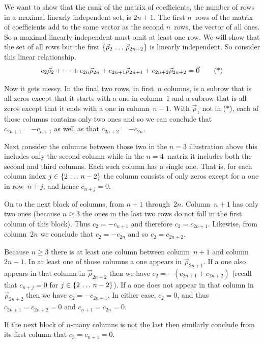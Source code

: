 We want to show that the rank of the matrix of coefficients,
the number of rows in a maximal linearly independent set, is $2n+1$.
The first $n$~rows of the matrix of coefficients add to the same vector
as the second $n$~rows, the vector of all ones.
So a maximal linearly independent must omit at least one row.
We will show that the set of all rows but the first 
$\mbox{$\{\vec{\rho}_2\,\ldots\, \vec{\rho}_{2n+2}\}$}$
is linearly independent.
So consider this linear relationship.
\begin{equation*}
  c_2\vec{\rho}_2+\cdots+c_{2n}\vec{\rho}_{2n}
     +c_{2n+1}\vec{\rho}_{2n+1}+c_{2n+2}\vec{\rho}_{2n+2}=\vec{0}
   \tag{*}
\end{equation*}

Now it gets messy.
In the final two rows, in first~$n$ columns, is a subrow that 
is all zeros except that it starts with a one in column~$1$
and a subrow that is all zeros except that it ends with a one
in column~$n-1$.
With $\vec{\rho}_1$ not in ($*$), each of those columns contains only 
two ones and so we can conclude that $c_{2n+1}=-c_{n+1}$ as well as that
$c_{2n+2}=-c_{2n}$.

Next consider the columns between those two\Dash
in the $n=3$ illustration above this includes only the second column while 
in the $n=4$~matrix it includes both the second and third columns.
Each such column has a single one.
That is, for each column index $j\in\mbox{$\{2\,\ldots\, n-2\}$}$
the column consists of only zeros except for a one in row~$n+j$, 
and hence $c_{n+j}=0$.

On to the next block of columns, from $n+1$ through~$2n$.
Column~$n+1$ has only two ones (because $n\geq 3$ the ones
in the last two rows do not fall in the first column of this
block). 
Thus $c_2=-c_{n+1}$
and therefore $c_2=c_{2n+1}$.
Likewise, from column~$2n$ we conclude that $c_2=-c_{2n}$
and so $c_2=c_{2n+2}$.  

Because $n\geq 3$
there is at least one column between column~$n+1$ and column~$2n-1$.
In at least one of those columns a one appears in $\vec{\rho}_{2n+1}$.
If a one also appears in that column in $\vec{\rho}_{2n+2}$ then we have 
$c_2=-(c_{2n+1}+c_{2n+2})$ 
(recall that $c_{n+j}=0$ for $j\in\mbox{$\{2\,\ldots\, n-2\}$}$).
If a one does not appear in that column in $\vec{\rho}_{2n+2}$
then we have $c_2=-c_{2n+1}$.
In either case, $c_2=0$, and thus 
$c_{2n+1}=c_{2n+2}=0$ and  
$c_{n+1}=c_{2n}=0$.

If the next block of $n$-many columns is not the last then similarly
conclude from its 
first column that $c_3=c_{n+1}=0$.

